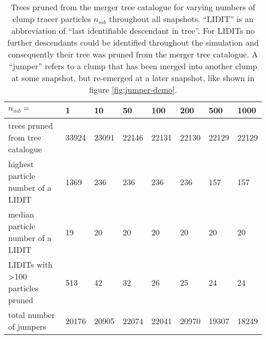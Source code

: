 \begin{table}[ht]
	\begin{center}
		{\small 
		\begin{tabular}[c]{l | p{1cm} | p{1cm} | p{1cm} | p{1cm} | p{1cm} | p{1cm} | p{1cm} |}
			$n_{mb}=$								&	1 		& 	10 		& 	50 		& 	100 	& 200 	& 500 	& 1000  \\
			\hline	
			trees pruned from tree catalogue		&	33924	&	23091	&	22146	& 	22131 	& 22130 & 22129 & 22129 \\	
			highest particle number of a LIDIT		&	1369	&	236		&	236		&	236 	& 236 	& 157 	& 157  	\\	
			median particle number of a LIDIT		&	19		&	20		&	20		&	20 		& 20 	& 20 	& 20  	\\
			LIDITs with >100 particles pruned 		&	513		&	42		&	32		&	26 		& 25 	& 24 	& 24  	\\
            total number of jumpers                 &  20176    &   20905   &   22074   &   22041   & 20970 & 19307 & 18249 \\
			\hline
		\end{tabular}
		}
	\caption{
		Trees pruned from the merger tree catalogue for varying numbers of clump tracer particles $n_{mb}$ throughout all snapshots. 
		``LIDIT'' is an abbreviation of ``last identifiable descendant in tree''. 
		For LIDITs no further descendants could be identified throughout the simulation and consequently their tree was pruned from the merger tree catalogue.
        A ``jumper'' refers to a clump that has been merged into another clump at some snapshot, but re-emerged at a later snapshot, like shown in figure \ref{fig:jumper-demo}.
		}
	\label{tab:ntracers-pruning}
	\end{center}	
\end{table}